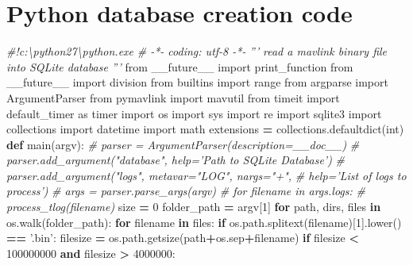 \documentclass[12pt,oneside]{reedthesis}
\newenvironment{Shaded}{\begin{snugshade}}{\end{snugshade}}
\newcommand{\KeywordTok}[1]{\textcolor[rgb]{0.13,0.29,0.53}{\textbf{#1}}}
\newcommand{\DecValTok}[1]{\textcolor[rgb]{0.00,0.00,0.81}{#1}}
\newcommand{\StringTok}[1]{\textcolor[rgb]{0.31,0.60,0.02}{#1}}
\newcommand{\ImportTok}[1]{#1}
\newcommand{\CommentTok}[1]{\textcolor[rgb]{0.56,0.35,0.01}{\textit{#1}}}
\newcommand{\ControlFlowTok}[1]{\textcolor[rgb]{0.13,0.29,0.53}{\textbf{#1}}}
\newcommand{\OperatorTok}[1]{\textcolor[rgb]{0.81,0.36,0.00}{\textbf{#1}}}
\newcommand{\BuiltInTok}[1]{#1}
\newcommand{\NormalTok}[1]{#1}
\theoremstyle{definition}
\theoremstyle{definition}
\theoremstyle{definition}
\theoremstyle{remark}
\begin{document}
\chapter{Python database creation
code}\label{python-database-creation-code}
\begin{Shaded}
\begin{Highlighting}[]
\CommentTok{#!c:\textbackslash{}python27\textbackslash{}python.exe}
\CommentTok{# -*- coding: utf-8 -*-}
\CommentTok{'''}
\CommentTok{read a mavlink binary file into SQLite database}
\CommentTok{'''}
\ImportTok{from}\NormalTok{ __future__ }\ImportTok{import}\NormalTok{ print_function}
\ImportTok{from}\NormalTok{ __future__ }\ImportTok{import}\NormalTok{ division}
\ImportTok{from}\NormalTok{ builtins   }\ImportTok{import} \BuiltInTok{range}
\ImportTok{from}\NormalTok{ argparse   }\ImportTok{import}\NormalTok{ ArgumentParser}
\ImportTok{from}\NormalTok{ pymavlink  }\ImportTok{import}\NormalTok{ mavutil}
\ImportTok{from}\NormalTok{ timeit     }\ImportTok{import}\NormalTok{ default_timer }\ImportTok{as}\NormalTok{ timer}
\ImportTok{import}\NormalTok{ os}
\ImportTok{import}\NormalTok{ sys}
\ImportTok{import}\NormalTok{ re}
\ImportTok{import}\NormalTok{ sqlite3}
\ImportTok{import}\NormalTok{ collections}
\ImportTok{import}\NormalTok{ datetime}
\ImportTok{import}\NormalTok{ math}
\NormalTok{extensions }\OperatorTok{=}\NormalTok{ collections.defaultdict(}\BuiltInTok{int}\NormalTok{)}
\KeywordTok{def}\NormalTok{ main(argv):}
    \CommentTok{# parser = ArgumentParser(description=__doc__)}
    \CommentTok{# parser.add_argument("database", help='Path to SQLite Database')}
    \CommentTok{# parser.add_argument("logs", metavar="LOG", nargs="+", }
      \CommentTok{# help='List of logs to process')}
    \CommentTok{# args = parser.parse_args(argv)}
    \CommentTok{# for filename in args.logs:}
    \CommentTok{#     process_tlog(filename)}
\NormalTok{    size }\OperatorTok{=} \DecValTok{0}
\NormalTok{    folder_path }\OperatorTok{=}\NormalTok{ argv[}\DecValTok{1}\NormalTok{]}
    \ControlFlowTok{for}\NormalTok{ path, dirs, files }\KeywordTok{in}\NormalTok{ os.walk(folder_path):}
        \ControlFlowTok{for}\NormalTok{ filename }\KeywordTok{in}\NormalTok{ files:}
            \ControlFlowTok{if}\NormalTok{ os.path.splitext(filename)[}\DecValTok{1}\NormalTok{].lower() }\OperatorTok{==} \StringTok{'.bin'}\NormalTok{:}
\NormalTok{                filesize }\OperatorTok{=}\NormalTok{ os.path.getsize(path}\OperatorTok{+}\NormalTok{os.sep}\OperatorTok{+}\NormalTok{filename)}
                \ControlFlowTok{if}\NormalTok{ filesize }\OperatorTok{<} \DecValTok{100000000} \KeywordTok{and}\NormalTok{ filesize }\OperatorTok{>} \DecValTok{4000000}\NormalTok{:}

\end{Highlighting}
\end{Shaded}
\end{document}
